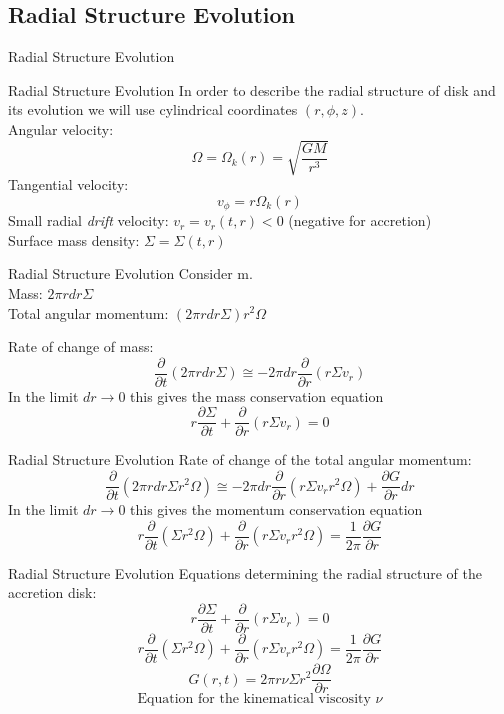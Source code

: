 \documentclass{beamer}
\begin{document}
\subsection{Radial Structure Evolution}    

\begin{frame}
\Huge
Radial Structure Evolution
\end{frame}

\begin{frame}{Radial Structure Evolution}
	In order to describe the radial structure of disk and its evolution we will use cylindrical coordinates $(r, \phi, z)$.\\
	\pause
	Angular velocity:
	\[ \Omega = \Omega_k (r) = \sqrt{\frac{GM}{r^3}} \]
	\pause
	Tangential velocity:
	\[v_\phi = r \Omega_k (r)\]
	\pause
	Small radial \textit{drift} velocity: $v_r = v_r (t,r) < 0 $ (negative for accretion)\\
	\pause
	Surface mass density: $\Sigma = \Sigma (t,r)$
\end{frame}

\begin{frame}{Radial Structure Evolution}
	Consider m.\\
	\pause	
	Mass: $2\pi r  dr \Sigma$\\
	\pause
	Total angular momentum: $(2\pi r dr \Sigma) r^2 \Omega$
	\pause
	\bigskip
	
	Rate of change of mass:
	\[ \frac{\partial }{\partial t} \left( 2\pi r  dr \Sigma \right) \cong -2\pi dr \frac{\partial}{\partial r} \left( r \Sigma v_r \right)\] 
	 \pause
	 In the limit $dr \rightarrow 0$ this gives the mass conservation equation
	 \[ r \frac{\partial \Sigma}{\partial t} + \frac{\partial}{\partial r} \left( r \Sigma v_r \right) = 0\] 
\end{frame}

\begin{frame}{Radial Structure Evolution}
	Rate of change of the total angular momentum:
	\[ \frac{\partial }{\partial t} \left( 2\pi r dr \Sigma r^2 \Omega \right) \cong -2\pi dr \frac{\partial}{\partial r} \left( r \Sigma v_r r^2 \Omega \right) + \frac{\partial G}{\partial r} dr \] 
	 \pause
	 In the limit $dr \rightarrow 0$ this gives the momentum conservation equation
	 \[ r \frac{\partial }{\partial t} \left( \Sigma r^2 \Omega \right) + \frac{\partial}{\partial r} \left( r \Sigma v_r  r^2 \Omega\right) = \frac{1}{2\pi} \frac{\partial G}{\partial r}\] 
\end{frame}

\begin{frame}{Radial Structure Evolution}
	Equations determining the radial structure of the accretion disk:
	\[ r \frac{\partial \Sigma}{\partial t} + \frac{\partial}{\partial r} \left( r \Sigma v_r \right) = 0\] 
	\[ r \frac{\partial }{\partial t} \left( \Sigma r^2 \Omega \right) + \frac{\partial}{\partial r} \left( r \Sigma v_r  r^2 \Omega\right) = \frac{1}{2\pi} \frac{\partial G}{\partial r}\] 
	\[G(r,t) = 2\pi r \nu \Sigma r^2  \frac{\partial \Omega}{\partial r}\]
	\[\textrm{Equation for the kinematical viscosity } \nu\]
\end{frame}
\end{document}
